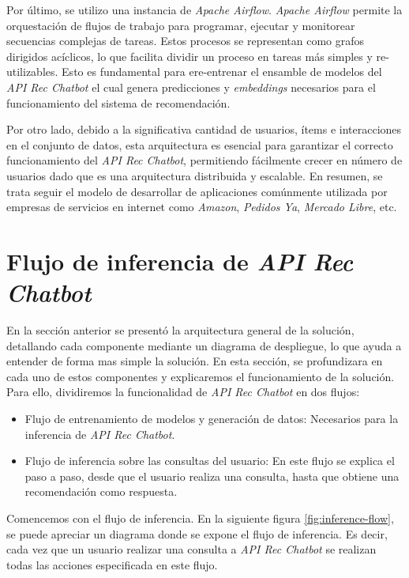 \documentclass[11pt,a4paper,twoside]{thesis}
\begin{document}
Por último, se utilizo una instancia de \textit{Apache Airflow}. \textit{Apache Airflow} permite la orquestación de flujos de trabajo para programar, ejecutar y monitorear secuencias complejas de tareas. Estos procesos se representan como grafos dirigidos acíclicos, lo que facilita dividir un proceso en tareas más simples y re-utilizables. Esto es fundamental para ere-entrenar el ensamble de modelos del \textit{API Rec Chatbot} el cual genera predicciones y \textit{embeddings} necesarios para el funcionamiento del sistema de recomendación.

Por otro lado, debido a la significativa cantidad de usuarios, ítems e interacciones en el conjunto de datos, esta arquitectura es esencial para garantizar el correcto funcionamiento del \textit{API Rec Chatbot}, permitiendo fácilmente crecer en número de usuarios dado que es una arquitectura distribuida y escalable. En resumen, se trata seguir el modelo de desarrollar de aplicaciones comúnmente utilizada por empresas de servicios en internet como \textit{Amazon}, \textit{Pedidos Ya}, \textit{Mercado Libre}, etc.

\chapter{Flujo de inferencia de \textit{API Rec Chatbot}}
En la sección anterior se presentó la arquitectura general de la solución, detallando cada componente mediante un diagrama de despliegue, lo que ayuda a entender de forma mas simple la solución. En esta sección, se profundizara en cada uno de estos componentes y explicaremos el funcionamiento de la solución. Para ello, dividiremos la funcionalidad de \textit{API Rec Chatbot} en dos flujos:

\begin{itemize}
	\setlength{\itemsep}{0pt}
	\setlength{\parskip}{0pt}

	\item Flujo de entrenamiento de modelos y generación de datos: Necesarios para la inferencia de \textit{API Rec Chatbot}.
	\item Flujo de inferencia sobre las consultas del usuario: En este flujo se explica el paso a paso, desde que el usuario realiza una consulta, hasta que obtiene una recomendación como respuesta.
\end{itemize}

Comencemos con el flujo de inferencia. En la siguiente figura \ref{fig:inference-flow}, se puede apreciar un diagrama donde se expone el flujo de inferencia. Es decir, cada vez que un usuario realizar una consulta a \textit{API Rec Chatbot} se realizan todas las acciones especificada en este flujo.
\vfill
\end{document}

